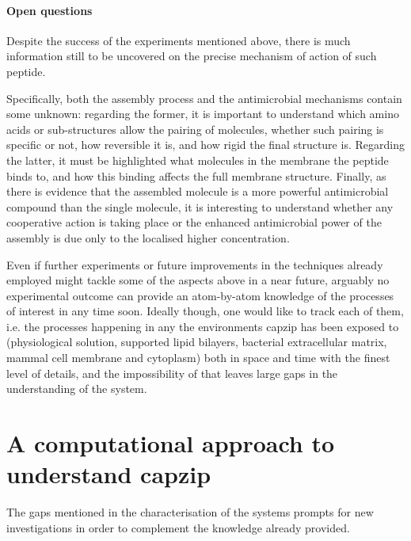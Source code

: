 
\paragraph{Open questions} Despite the success of the experiments mentioned above, there is much information still to be uncovered on the precise mechanism of action of such peptide. 

Specifically, both the assembly process and the antimicrobial mechanisms contain some unknown: regarding the former, it is important to understand which amino acids or sub-structures allow the pairing of molecules, whether such pairing is specific or not, how reversible it is, and how rigid the final structure is.
%
Regarding the latter, it must be highlighted what molecules in the membrane the peptide binds to, and how this binding affects the full membrane structure. Finally, as there is evidence that the assembled molecule is a more powerful antimicrobial compound than the single molecule, it is interesting to understand whether any cooperative action is taking place or the enhanced antimicrobial power of the assembly is due only to the localised higher concentration.

Even if further experiments or future improvements in the techniques already employed might tackle some of the aspects above in a near future, arguably no experimental outcome can provide an atom-by-atom knowledge of the processes of interest in any time soon. Ideally though, one would like to track each of them, i.e. the processes happening in any the environments capzip has been exposed to (physiological solution, supported lipid bilayers, bacterial extracellular matrix, mammal cell membrane and cytoplasm) both in space and time with the finest level of details, and the impossibility of that leaves large gaps in the understanding of the system.


\section{A computational approach to understand capzip}

The gaps mentioned in the characterisation of the systems prompts for new investigations in order to complement the knowledge already provided.

